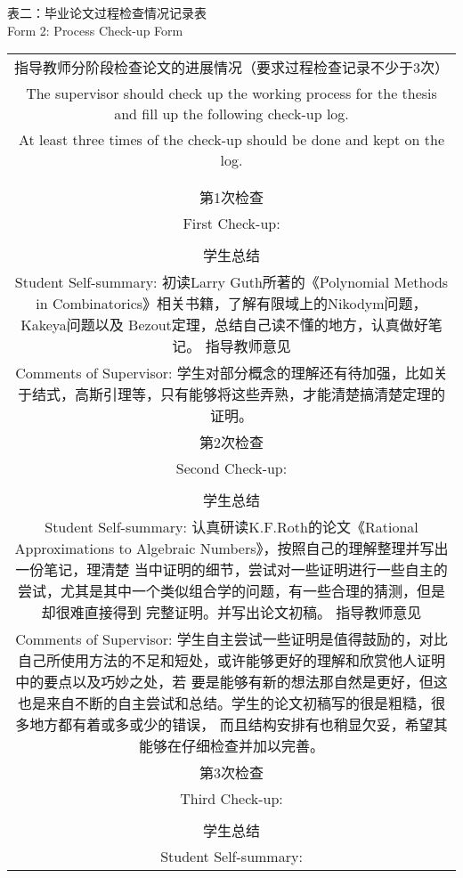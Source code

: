 \begin{center}
表二：毕业论文过程检查情况记录表\\
Form 2: Process Check-up Form
\end{center}

\begin{tabular}{|c|}%
\hline  %
指导教师分阶段检查论文的进展情况（要求过程检查记录不少于3次）\\
The supervisor should check up the working process for the thesis and fill up the following check-up log. \\
At least three times of the check-up should be done and kept on the log. \\
\\
\\
第1次检查 \\
First Check-up:
\\
\\
\noindent
学生总结 \\
Student Self-summary:
初读Larry Guth所著的《Polynomial Methods in Combinatorics》相关书籍，了解有限域上的Nikodym问题，Kakeya问题以及
Bezout定理，总结自己读不懂的地方，认真做好笔记。
指导教师意见 \\
Comments of Supervisor:
学生对部分概念的理解还有待加强，比如关于结式，高斯引理等，只有能够将这些弄熟，才能清楚搞清楚定理的证明。
\\
第2次检查 \\
Second Check-up:
\\
\\
学生总结 \\
Student Self-summary:
认真研读K.F.Roth的论文《Rational Approximations to Algebraic Numbers》，按照自己的理解整理并写出一份笔记，理清楚
当中证明的细节，尝试对一些证明进行一些自主的尝试，尤其是其中一个类似组合学的问题，有一些合理的猜测，但是却很难直接得到
完整证明。并写出论文初稿。
指导教师意见 \\
Comments of Supervisor:
学生自主尝试一些证明是值得鼓励的，对比自己所使用方法的不足和短处，或许能够更好的理解和欣赏他人证明中的要点以及巧妙之处，若
要是能够有新的想法那自然是更好，但这也是来自不断的自主尝试和总结。学生的论文初稿写的很是粗糙，很多地方都有着或多或少的错误，
而且结构安排有也稍显欠妥，希望其能够在仔细检查并加以完善。
\\
第3次检查 \\
Third Check-up:
\\
\\
学生总结 \\
Student Self-summary:

\end{tabular}

